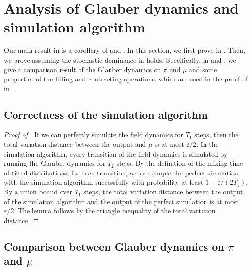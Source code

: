 \documentclass[11pt,a4paper]{article}
\renewcommand{\epsilon}{\varepsilon}
\theoremstyle{definition}
\begin{document}
\section{Analysis of Glauber dynamics and simulation algorithm}\label{sec:comparison-between-original-and-lifted-Glauber-dynamics-1}
Our main result in  is a corollary of  and .
In this section, we first prove  in .
Then, we prove  assuming the stochastic dominance in  holds.
Specifically, in  and , we give a comparison result of the Glauber dynamics on $\pi$ and $\mu$ and some properties of the lifting and contracting operations, which are used in the proof of  in .

\subsection{Correctness of the simulation algorithm}\label{sec:simu-error}
\begin{proof}[Proof of ]
If we can perfectly simulate the field dynamics for $T_1$ steps, then the total variation distance between the output and $\mu$ is at most $\epsilon/2$. In the simulation algorithm, every transition of the field dynamics is simulated by running the Glauber dynamics for $T_2$ steps. By the definition of the mixing time of tilted distributions, for each transition, we can couple the perfect simulation with the simulation algorithm successfully with probability at least $1-\epsilon/(2T_1)$. By a union bound over $T_1$ steps, the total variation distance between the output of the simulation algorithm and the output of the perfect simulation is at most $\epsilon/2$. The lemma follows by the triangle inequality of the total variation distance.
\end{proof}


\subsection{Comparison between Glauber dynamics on \texorpdfstring{$\pi$}{} and \texorpdfstring{$\mu$}{}}\label{sec:comparison-between-original-and-lifted-Glauber-dynamics-2}
\end{document}
